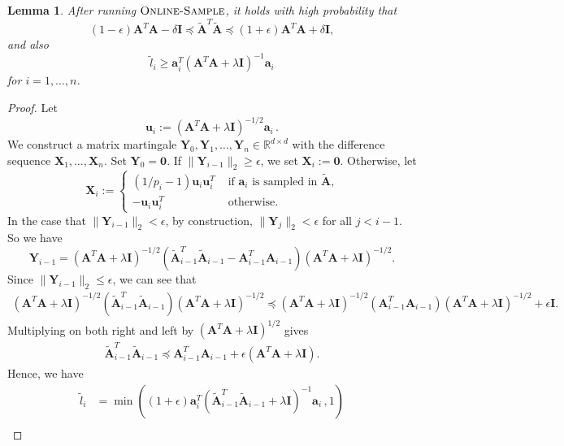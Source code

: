 \documentclass[11pt]{article}
\numberwithin{equation}{section}
\newtheorem{lemma}[theorem]{Lemma}
\theoremstyle{definition}
\theoremstyle{plain}
\newcommand{\bv}[1]{\mathbf{#1}}
\newcommand{\norm}[1]{\|#1\|}
\begin{document}
\begin{lemma}
    \label{lem:online-sample}
    After running $\textsc{Online-Sample}$, it holds with high probability that
    $$
        (1-\epsilon)\bv{A}^T\bv{A} - \delta\bv{I} \preceq \bv{\tilde{A}}^T\bv{\tilde{A}} \preceq (1+\epsilon)\bv{A}^T\bv{A} + \delta\bv{I},
    $$
    and also
    $$
        \tilde{l}_i \geq \bv{a}_i^T (\bv{A}^T\bv{A} + \lambda\bv{I})^{-1} \bv{a}_i
    $$
    for $i = 1, \ldots, n$.
\end{lemma}
\begin{proof}
    Let
    $$
        \bv{u}_i := (\bv{A}^T\bv{A} + \lambda \bv{I})^{-1/2} \bv{a}_i\,.
    $$
    We construct a matrix martingale $\bv{Y}_0, \bv{Y}_1, \ldots, \bv{Y}_n \in \mathbb{R}^{d\times d}$ with the difference sequence $\bv{X}_1, \ldots, \bv{X}_n$.
    Set $\bv {Y}_0 = \bv 0$. If $\norm{\bv{Y}_{i-1}}_2 \geq \epsilon$, we set $\bv{X}_i := \bv{0}$.
    Otherwise, let
    $$
        \bv{X}_i :=
        \begin{cases}
            (1/p_i - 1) \bv{u}_i \bv{u}_i^T &\mbox{ if $\bv{a}_i$ is sampled in $\bv{\tilde A}$,}\\
            - \bv{u}_i \bv{u}_i^T &\mbox{ otherwise.}
        \end{cases}
    $$
    In the case that $\norm{\bv{Y}_{i-1}}_2 < \epsilon$, by construction, $\norm{\bv{Y}_{j}}_2 < \epsilon$ for all $j < i-1$. 
So we have %
    $$
        \bv{Y}_{i-1} = (\bv{A}^T\bv{A} + \lambda \bv{I})^{-1/2}(\bv{\tilde{A}}_{i-1}^T\bv{\tilde{A}}_{i-1} - \bv{A}_{i-1}^T\bv{A}_{i-1})(\bv{A}^T\bv{A} + \lambda \bv{I})^{-1/2}.
    $$
    Since $\norm{\bv{Y}_{i-1}}_2 \le \epsilon$, we can see that
    \begin{align*}
     (\bv{A}^T\bv{A} + \lambda \bv{I})^{-1/2}(\bv{\tilde{A}}_{i-1}^T\bv{\tilde{A}}_{i-1})(\bv{A}^T\bv{A} + \lambda \bv{I})^{-1/2} \preceq   (\bv{A}^T\bv{A} + \lambda \bv{I})^{-1/2}(\bv{A}_{i-1}^T\bv{A}_{i-1}) (\bv{A}^T\bv{A} + \lambda \bv{I})^{-1/2} + \epsilon \bv{I}.
    \end{align*}
    Multiplying on both right and left by  $(\bv{A}^T\bv{A} + \lambda \bv{I})^{1/2}$ gives
    \begin{align*}
    \bv{\tilde{A}}_{i-1}^T\bv{\tilde{A}}_{i-1} \preceq \bv{A}_{i-1}^T\bv{A}_{i-1} + \epsilon (\bv{A}^T\bv{A} + \lambda \bv{I}).
    \end{align*}
    Hence, we have
    \begin{align}
        \tilde{l}_i &= \min((1+\epsilon)\bv{a}_i^T (\bv{\tilde{A}}_{i-1}^T \bv{\tilde{A}}_{i-1} + \lambda \bv{I})^{-1} \bv{a}_i\,, 1) \nonumber \\

\end{align}
\end{proof}
\end{document}
